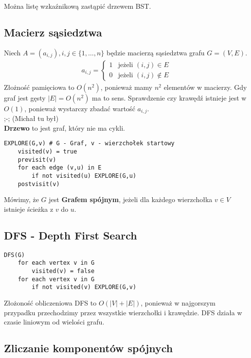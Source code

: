 \documentclass{article}
\numberwithin{equation}{subsection}
\begin{document}
Można listę wzkaźnikową zastąpić drzewem BST.

\subsection{Macierz sąsiedztwa}

Niech $A=(a_{i,j}), i,j\in\{1,\dots,n\}$ będzie macierzą sąsiedztwa grafu $G=(V,E)$.
\begin{align}
    a_{i,j} = \begin{cases}
        1 & \text{jeżeli } (i,j)\in E\\
        0 & \text{jeżeli } (i,j)\notin E
    \end{cases}
\end{align}
Złożność pamięciowa to $O(n^2)$, ponieważ mamy $n^2$ elementów w macierzy. Gdy graf jest gęsty $|E| = O(n^2)$ ma to sens.
Sprawdzenie czy krawędź istnieje jest w $O(1)$, ponieważ wystarczy zbadać wartość $a_{i,j}$.\\

\noindent
;-; (Michał tu był)\\

\noindent
\textbf{Drzewo} to jest graf, który nie ma cykli.

\begin{verbatim}
EXPLORE(G,v) # G - Graf, v - wierzchołek startowy
    visited(v) = true
    previsit(v)
    for each edge (v,u) in E
        if not visited(u) EXPLORE(G,u)
    postvisit(v)
\end{verbatim}

\noindent
Mówimy, że $G$ jest \textbf{Grafem spójnym}, jeżeli dla każdego wierzchołka $v\in V$ istnieje ścieżka z $v$ do $u$.

\subsection{DFS - Depth First Search}

\begin{verbatim}
DFS(G)
    for each vertex v in G
        visited(v) = false
    for each vertex v in G
        if not visited(v) EXPLORE(G,v)
\end{verbatim}
Złożoność obliczeniowa DFS to $O(|V|+|E|)$, ponieważ w najgorszym przypadku przechodzimy przez wszystkie wierzchołki i krawędzie.
DFS działa w czasie liniowym od wielości grafu.

\subsection{Zliczanie komponentów spójnych}
\end{document}
